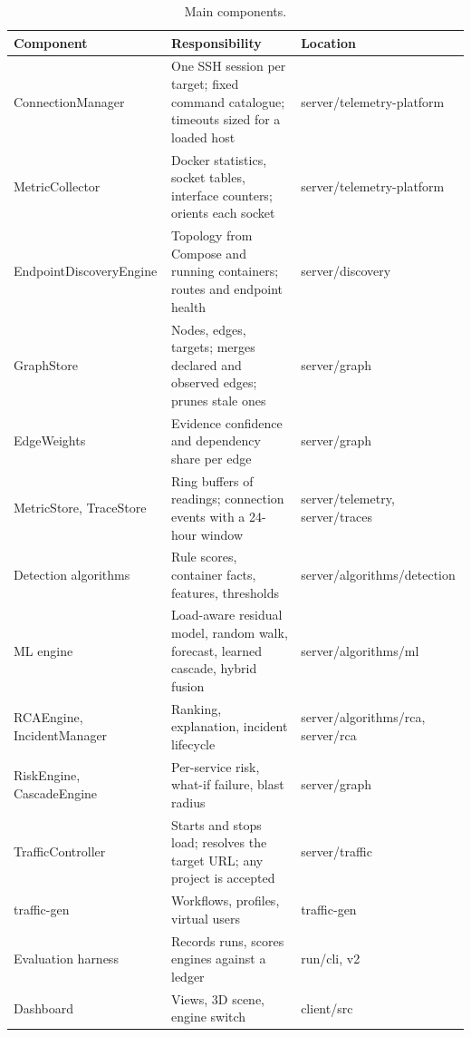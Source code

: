 \begin{table}[!htbp]
\centering
\caption{Main components.}
\label{tab:components}
\small
\renewcommand{\arraystretch}{1.2}
\begin{tabularx}{\textwidth}{>{\raggedright\arraybackslash}p{3.9cm}>{\raggedright\arraybackslash}X>{\raggedright\arraybackslash}p{4.2cm}}
\toprule
\textbf{Component} & \textbf{Responsibility} & \textbf{Location}\\
\midrule
ConnectionManager & One SSH session per target; fixed command catalogue; timeouts sized for a loaded host & {\ttfamily\scriptsize server/telemetry-platform}\\
MetricCollector & Docker statistics, socket tables, interface counters; orients each socket & {\ttfamily\scriptsize server/telemetry-platform}\\
EndpointDiscoveryEngine & Topology from Compose and running containers; routes and endpoint health & {\ttfamily\scriptsize server/discovery}\\
GraphStore & Nodes, edges, targets; merges declared and observed edges; prunes stale ones & {\ttfamily\scriptsize server/graph}\\
EdgeWeights & Evidence confidence and dependency share per edge & {\ttfamily\scriptsize server/graph}\\
MetricStore, TraceStore & Ring buffers of readings; connection events with a 24-hour window & {\ttfamily\scriptsize server/telemetry}, {\ttfamily\scriptsize server/traces}\\
Detection algorithms & Rule scores, container facts, features, thresholds & {\ttfamily\scriptsize server/algorithms/detection}\\
ML engine & Load-aware residual model, random walk, forecast, learned cascade, hybrid fusion & {\ttfamily\scriptsize server/algorithms/ml}\\
RCAEngine, IncidentManager & Ranking, explanation, incident lifecycle & {\ttfamily\scriptsize server/algorithms/rca}, {\ttfamily\scriptsize server/rca}\\
RiskEngine, CascadeEngine & Per-service risk, what-if failure, blast radius & {\ttfamily\scriptsize server/graph}\\
TrafficController & Starts and stops load; resolves the target URL; any project is accepted & {\ttfamily\scriptsize server/traffic}\\
traffic-gen & Workflows, profiles, virtual users & {\ttfamily\scriptsize traffic-gen}\\
Evaluation harness & Records runs, scores engines against a ledger & {\ttfamily\scriptsize run/cli}, {\ttfamily\scriptsize v2}\\
Dashboard & Views, 3D scene, engine switch & {\ttfamily\scriptsize client/src}\\
\bottomrule
\end{tabularx}
\end{table}


